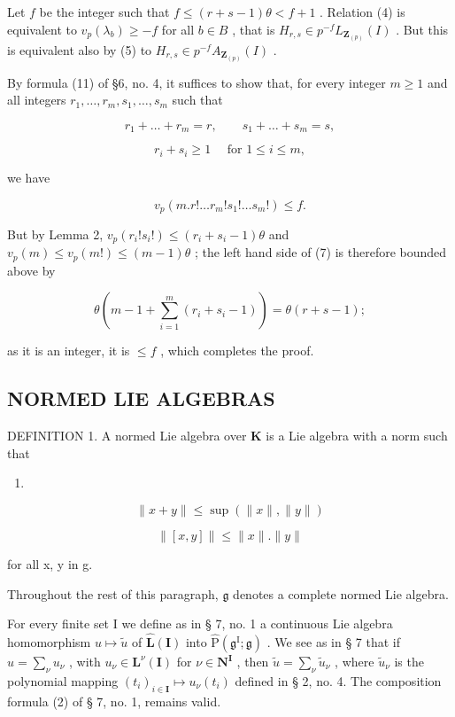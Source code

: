 Let \(f\) be the integer such that \(f \leqslant (r + s - 1)\theta < f + 1\) . Relation (4) is equivalent to \(v_{p}(\lambda_{b}) \geqslant -f\) for all \(b \in B\) , that is \(H_{r,s} \in p^{-f}L_{\mathbf{Z}_{(p)}}(I)\) . But this is equivalent also by (5) to \(H_{r,s} \in p^{-f}A_{\mathbf{Z}_{(p)}}(I)\) .

By formula (11) of §6, no. 4, it suffices to show that, for every integer \(m \geqslant 1\) and all integers \(r_1, \ldots, r_m, s_1, \ldots, s_m\) such that

\[
r _ {1} + \dots + r _ {m} = r, \qquad s _ {1} + \dots + s _ {m} = s,\tag{6}
\]

\[
r _ {i} + s _ {i} \geqslant 1 \quad \text { for } 1 \leqslant i \leqslant m,
\]

we have

\[
v _ {p} (m. r! \dots r _ {m}! s _ {1}! \dots s _ {m}!) \leqslant f.\tag{7}
\]

But by Lemma 2, \(v_{p}(r_{i}!s_{i}!) \leqslant (r_{i} + s_{i} - 1)\theta\) and \(v_{p}(m) \leqslant v_{p}(m!) \leqslant (m - 1)\theta\) ; the left hand side of (7) is therefore bounded above by

\[
\theta (m - 1 + \sum_ {i = 1} ^ {m} \left(r _ {i} + s _ {i} - 1\right)) = \theta (r + s - 1);
\]

as it is an integer, it is \(\leqslant f\) , which completes the proof.

\subsection{NORMED LIE ALGEBRAS}

DEFINITION 1. A normed Lie algebra over \(\mathbf{K}\) is a Lie algebra with a norm such that

\begin{enumerate}
\def\labelenumi{(\arabic{enumi})}
\setcounter{enumi}{7}
\tightlist
\item
\end{enumerate}

\[
\| x + y \| \leqslant \sup (\| x \|, \| y \|)\tag{8}
\]

\[
\| [ x, y ] \| \leqslant \| x \|. \| y \|\tag{9}
\]

for all x, y in g.

Throughout the rest of this paragraph, \(\mathfrak{g}\) denotes a complete normed Lie algebra.

For every finite set I we define as in § 7, no. 1 a continuous Lie algebra homomorphism \(u \mapsto \tilde{u}\) of \(\hat{\mathbf{L}}(\mathbf{I})\) into \(\hat{\mathrm{P}}(\mathfrak{g}^{\mathrm{I}}; \mathfrak{g})\) . We see as in § 7 that if \(u = \sum_{\nu} u_{\nu}\) , with \(u_{\nu} \in \mathbf{L}^{\nu}(\mathbf{I})\) for \(\nu \in \mathbf{N}^{\mathbf{I}}\) , then \(\tilde{u} = \sum_{\nu} \tilde{u}_{\nu}\) , where \(\tilde{u}_{\nu}\) is the polynomial mapping \((t_i)_{i \in \mathbf{I}} \mapsto u_{\nu}(t_i)\) defined in § 2, no. 4. The composition formula (2) of § 7, no. 1, remains valid.

